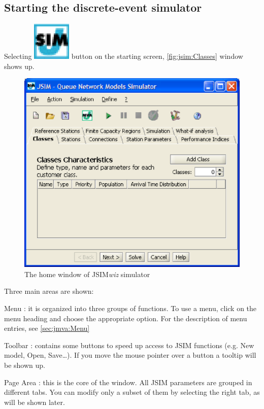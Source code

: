 \subsection{Starting the discrete-event simulator}
Selecting \includegraphics[scale=.5]{img/JSIMIcon.eps} button on the
starting screen, \autoref{fig:jsim:Classes} window shows up.
\begin{figure}[htb]
    \begin{center}
        \includegraphics[scale=.5]{img/jsim/define_class1.eps}
    \end{center}
    \caption{The home window of JSIM\emph{wiz} simulator}
    \label{fig:jsim:Classes}
\end{figure}
Three main areas are shown:
\begin{description*}
\item[Menu :] it is organized into three groups of functions. To use a
menu, click on the menu heading and choose the appropriate option.
For the description of menu entries, see \autoref{sec:jmva:Menu}
\item[Toolbar :] contains some buttons to speed up access to JSIM functions
(e.g. New model, Open, Save\dots ). If you move the mouse pointer over a button a tooltip will be shown up.
\item[Page Area :] this is the core of the window. All JSIM parameters are grouped in
different tabs. You can modify only a subset of them by selecting
the right tab, as will be shown later.
\end{description*}

